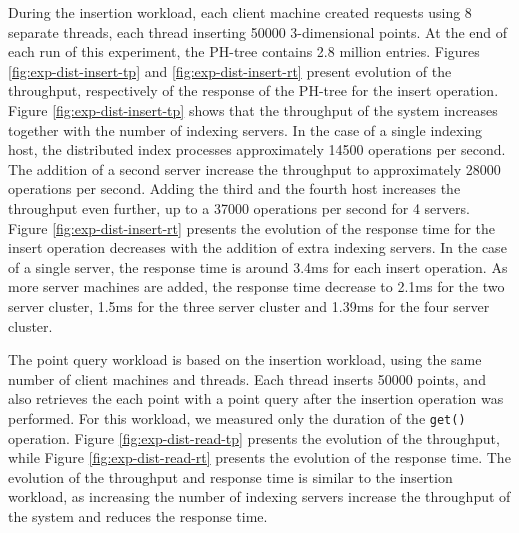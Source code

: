 \documentclass[11pt,a4paper]{globis-book}
\begin{document}
During the insertion workload, each client machine created requests using 8 separate threads, each thread inserting 50000 3-dimensional points. At the end of each run of this experiment, the PH-tree contains 2.8 million entries. Figures \ref{fig:exp-dist-insert-tp} and \ref{fig:exp-dist-insert-rt} present evolution of the throughput, respectively of the response of the PH-tree for the insert operation. Figure \ref{fig:exp-dist-insert-tp} shows that the throughput of the system increases together with the number of indexing servers. In the case of a single indexing host, the distributed index processes approximately 14500 operations per second. The addition of a second server increase the throughput to approximately 28000 operations per second. Adding the third and the fourth host increases the throughput even further, up to a 37000 operations per second for 4 servers. Figure \ref{fig:exp-dist-insert-rt} presents the evolution of the response time for the insert operation decreases with the addition of extra indexing servers. In the case of a single server, the response time is around 3.4ms for each insert operation. As more server machines are added, the response time decrease to 2.1ms for the two server cluster, 1.5ms for the three server cluster and 1.39ms for the four server cluster.

The point query workload is based on the insertion workload, using the same number of client machines and threads. Each thread inserts 50000 points, and also retrieves the each point with a point query after the insertion operation was performed. For this workload, we measured only the duration of the \texttt{get()} operation.  Figure \ref{fig:exp-dist-read-tp} presents the evolution of the throughput, while Figure \ref{fig:exp-dist-read-rt} presents the evolution of the response time. The evolution of the throughput and response time is similar to the insertion workload, as increasing the number of indexing servers increase the throughput of the system and reduces the response time. 
\end{document}
